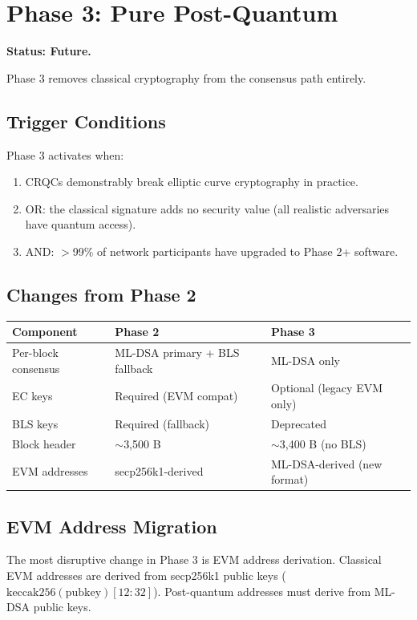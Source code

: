 \section{Phase 3: Pure Post-Quantum}


\textbf{Status: Future.}

Phase 3 removes classical cryptography from the consensus path entirely.

\subsection{Trigger Conditions}

Phase 3 activates when:
\begin{enumerate}[leftmargin=2em]
\item CRQCs demonstrably break elliptic curve cryptography in practice.
\item OR: the classical signature adds no security value (all realistic adversaries have quantum access).
\item AND: $>$99\% of network participants have upgraded to Phase 2+ software.
\end{enumerate}

\subsection{Changes from Phase 2}

\begin{center}
\begin{tabular}{lll}
\toprule
\textbf{Component} & \textbf{Phase 2} & \textbf{Phase 3} \\
\midrule
Per-block consensus & ML-DSA primary + BLS fallback & ML-DSA only \\
EC keys & Required (EVM compat) & Optional (legacy EVM only) \\
BLS keys & Required (fallback) & Deprecated \\
Block header & $\sim$3,500 B & $\sim$3,400 B (no BLS) \\
EVM addresses & secp256k1-derived & ML-DSA-derived (new format) \\
\bottomrule
\end{tabular}
\end{center}

\subsection{EVM Address Migration}

The most disruptive change in Phase 3 is EVM address derivation. Classical EVM addresses are derived from secp256k1 public keys ($\text{keccak256}(\text{pubkey})[12:32]$). Post-quantum addresses must derive from ML-DSA public keys.

